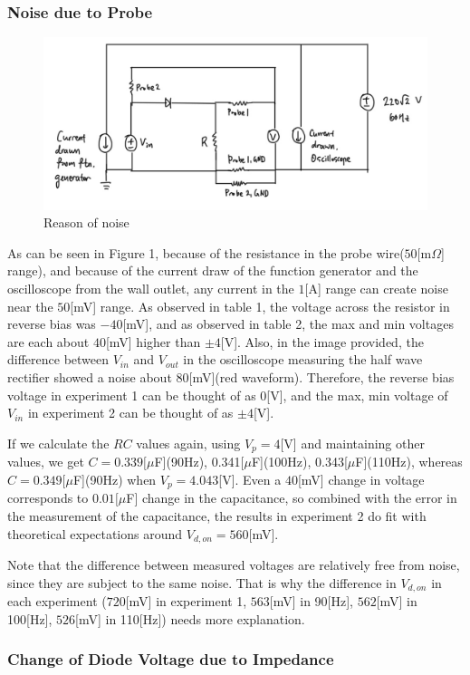 \documentclass[a4paper, itemph]{oblivoir}
\theoremstyle{definition}
\begin{document}
\subsubsection{Noise due to Probe}
\begin{figure}[htb]
    \centering
    \includegraphics[width=0.5\linewidth]{Probe.jpeg}
    \caption{Reason of noise}
\end{figure}
As can be seen in Figure 1, because of the resistance in the probe wire($50$[m$\Omega$] range), and because of the current draw of the function generator and the oscilloscope from the wall outlet, any current in the $1$[A] range can create noise near the $50$[mV] range. As observed in table 1, the voltage across the resistor in reverse bias was $-40$[mV], and as observed in table 2, the max and min voltages are each about $40$[mV] higher than $\pm4$[V]. Also, in the image provided, the difference between $V_{in}$ and $V_{out}$ in the oscilloscope measuring the half wave rectifier showed a noise about $80$[mV](red waveform). Therefore, the reverse bias voltage in experiment 1 can be thought of as 0[V], and the max, min voltage of $V_{in}$ in experiment 2 can be thought of as $\pm4$[V].

If we calculate the $RC$ values again, using $V_p=4$[V] and maintaining other values, we get $C=0.339[\mu$F](90Hz), 0.341[$\mu$F](100Hz), 0.343[$\mu$F](110Hz), whereas $C=0.349[\mu$F](90Hz) when $V_p=4.043$[V]. Even a $40$[mV] change in voltage corresponds to $0.01[\mu$F] change in the capacitance, so combined with the error in the measurement of the capacitance, the results in experiment 2 do fit with theoretical expectations around $V_{d,on}=560$[mV].

Note that the difference between measured voltages are relatively free from noise, since they are subject to the same noise. That is why the difference in $V_{d,on}$ in each experiment ($720$[mV] in experiment 1, $563$[mV] in 90[Hz], $562$[mV] in 100[Hz], $526$[mV] in 110[Hz]) needs more explanation.
\subsubsection{Change of Diode Voltage due to Impedance}
\begin{center}
\end{center}
\end{document}
